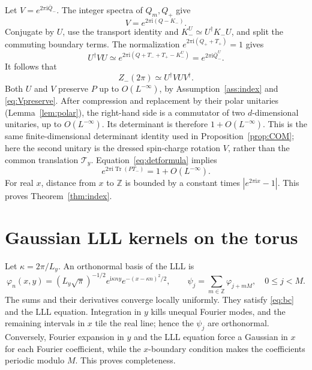 \documentclass[11pt]{article}
\theoremstyle{definition}
\theoremstyle{remark}
\newcommand{\ii}{\mathrm i}
\newcommand{\Tr}{\operatorname{Tr}}
\newcommand{\epsL}{O(L^{-\infty})}
\newcommand{\eqL}{\simeq}
\newcommand{\abs}[1]{\left|#1\right|}
\begin{document}
Let \(V=e^{2\pi\ii\bar Q_-}\).  The integer spectra of \(Q_m,Q_+\)
give
\[
 V=e^{2\pi\ii(Q-K_-)}.
\]
Conjugate by \(U\), use the transport identity and
\(K_-^U\eqL U^\dagger K_-U\), and split the commuting boundary
terms.  The normalization
\(e^{2\pi\ii(Q_++T_+)}=1\) gives
\[
 U^\dagger VU
 \eqL e^{2\pi\ii(Q+T_-+T_+-K_-^U)}
 =e^{2\pi\ii\bar Q_-^U}.
\]
It follows that
\[
 Z_-(2\pi)\eqL U^\dagger VU V^\dagger.
\]
Both \(U\) and \(V\) preserve \(P\) up to \(\epsL\), by
Assumption~\ref{ass:index} and \eqref{eq:Vpreserve}.
After compression and replacement by their polar unitaries
(Lemma~\ref{lem:polar}), the right-hand side is a commutator
of two \(d\)-dimensional unitaries, up to \(\epsL\).
Its determinant is therefore \(1+\epsL\).  This is the same
finite-dimensional determinant identity used in
Proposition~\ref{prop:COM}; here the second unitary is the
dressed spin-charge rotation \(V\), rather than the common
translation \(\mathcal T_y\).
Equation~\eqref{eq:detformula} implies
\[
 e^{2\pi\ii\Tr(PT_-)}=1+\epsL.
\]
For real \(x\), distance from \(x\) to \(\mathbb Z\) is bounded
by a constant times \(\abs{e^{2\pi\ii x}-1}\).
This proves Theorem~\ref{thm:index}.

\appendix
\section{Gaussian LLL kernels on the torus}\label{app:kernel}

Let \(\kappa=2\pi/L_y\).  An orthonormal basis of the LLL is
\[
 \varphi_n(x,y)=(L_y\sqrt\pi)^{-1/2}
      e^{\ii\kappa ny}e^{-(x-\kappa n)^2/2},\qquad
 \psi_j=\sum_{m\in\mathbb Z}\varphi_{j+mM},
 \quad 0\le j<M.
\]
The sums and their derivatives converge locally uniformly.
They satisfy \eqref{eq:bc} and the LLL equation.
Integration in \(y\) kills unequal Fourier modes, and the
remaining intervals in \(x\) tile the real line; hence the
\(\psi_j\) are orthonormal.  Conversely, Fourier expansion in
\(y\) and the LLL equation force a Gaussian in \(x\) for each
Fourier coefficient, while the \(x\)-boundary condition makes
the coefficients periodic modulo \(M\).  This proves completeness.
\end{document}
